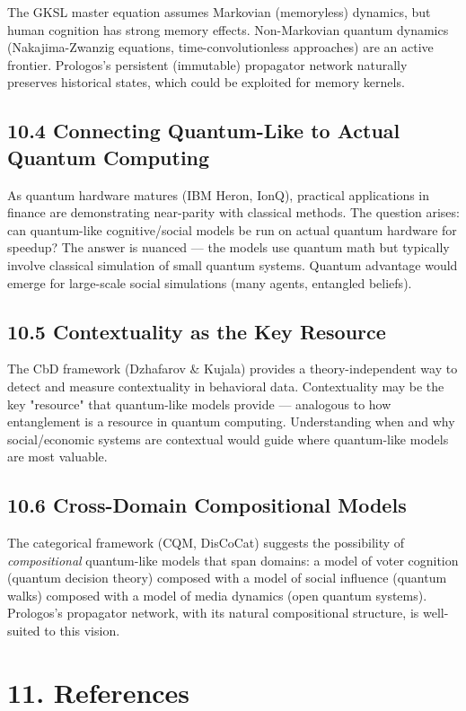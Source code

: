 \documentclass[11pt]{article}
\begin{document}
The GKSL master equation assumes Markovian (memoryless) dynamics, but human
cognition has strong memory effects. Non-Markovian quantum dynamics
(Nakajima-Zwanzig equations, time-convolutionless approaches) are an active
frontier. Prologos's persistent (immutable) propagator network naturally
preserves historical states, which could be exploited for memory kernels.
\subsection{10.4 Connecting Quantum-Like to Actual Quantum Computing}
\label{sec:org8fbfdfd}

As quantum hardware matures (IBM Heron, IonQ), practical applications in finance
are demonstrating near-parity with classical methods. The question arises: can
quantum-like cognitive/social models be run on actual quantum hardware for
speedup? The answer is nuanced --- the models use quantum math but typically
involve classical simulation of small quantum systems. Quantum advantage would
emerge for large-scale social simulations (many agents, entangled beliefs).
\subsection{10.5 Contextuality as the Key Resource}
\label{sec:org03f4c3f}

The CbD framework (Dzhafarov \& Kujala) provides a theory-independent way to
detect and measure contextuality in behavioral data. Contextuality may be the
key "resource" that quantum-like models provide --- analogous to how entanglement
is a resource in quantum computing. Understanding when and why social/economic
systems are contextual would guide where quantum-like models are most valuable.
\subsection{10.6 Cross-Domain Compositional Models}
\label{sec:org2f4401a}

The categorical framework (CQM, DisCoCat) suggests the possibility of
\emph{compositional} quantum-like models that span domains: a model of voter cognition
(quantum decision theory) composed with a model of social influence (quantum
walks) composed with a model of media dynamics (open quantum systems). Prologos's
propagator network, with its natural compositional structure, is well-suited to
this vision.
\section{11. References}
\label{sec:org07ec632}
\end{document}
